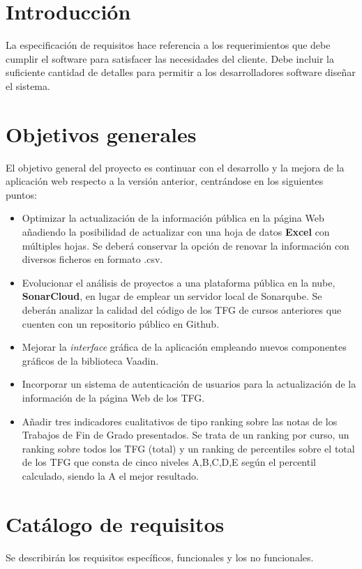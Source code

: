 
\section{Introducción}
La especificación de requisitos hace referencia a los requerimientos que debe cumplir el software para satisfacer las necesidades del cliente. Debe incluir la suficiente cantidad de detalles para permitir a los desarrolladores software diseñar el sistema.

\section{Objetivos generales}
El objetivo general del proyecto es continuar con el desarrollo y la mejora de la aplicación web respecto a la versión anterior, centrándose en los siguientes puntos:
\begin{itemize}
	\item Optimizar la actualización de la información pública en la página Web añadiendo la posibilidad de actualizar con una hoja de datos \textbf{Excel} con múltiples hojas. Se deberá conservar la opción de renovar la información con diversos ficheros en formato .csv. 
	\item Evolucionar el análisis de proyectos a una plataforma pública en la nube, \textbf{SonarCloud}, en lugar de emplear un servidor local de Sonarqube. Se deberán analizar la calidad del código de los TFG de cursos anteriores que cuenten con un repositorio público en Github.
	\item Mejorar la \emph{interface} gráfica de la aplicación empleando nuevos componentes gráficos de la biblioteca Vaadin. 
	\item Incorporar un sistema de autenticación de usuarios para la actualización de la información de la página Web de los TFG.
	\item Añadir tres indicadores cualitativos de tipo ranking sobre las notas de los Trabajos de Fin de Grado presentados. Se trata de un ranking por curso, un ranking sobre todos los TFG (total) y un ranking de percentiles sobre el total de los TFG que consta de cinco niveles A,B,C,D,E según el percentil calculado, siendo la A el mejor resultado.
\end{itemize}

\section{Catálogo de requisitos}
Se describirán los requisitos específicos, funcionales y los no funcionales.


